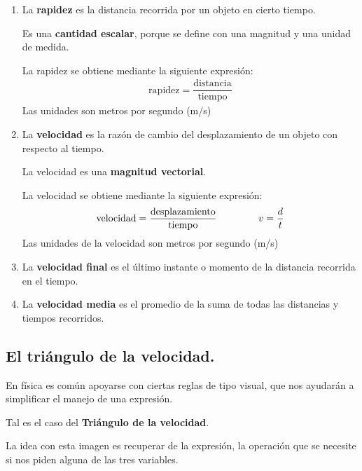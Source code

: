 \documentclass[14pt]{extarticle}
\newcommand{\textocolor}[2]{\textbf{\textcolor{#1}{#2}}}
\begin{document}
\begin{enumerate}
\item La \textocolor{auburn}{rapidez} es la distancia recorrida por un objeto en cierto tiempo.

Es una \textocolor{awesome}{cantidad escalar}, porque se define con una magnitud y una unidad de medida.

La rapidez se obtiene mediante la siguiente expresión:
\begin{align*}
\text{rapidez} = \dfrac{\text{distancia}}{\text{tiempo}}
\end{align*}
Las unidades son metros por segundo (\unit[per-mode=symbol]{\meter\per\second})

\item La \textocolor{carmine}{velocidad} es la razón de cambio del desplazamiento de un objeto con respecto al tiempo.

La velocidad es una \textocolor{byzantine}{magnitud vectorial}.

La velocidad se obtiene mediante la siguiente expresión:
\begin{eqnarray*}
\begin{aligned}
\text{velocidad} = \dfrac{\text{desplazamiento}}{\text{tiempo}}  \hspace*{1.5cm} v = \dfrac{d}{t}
\end{aligned}
\end{eqnarray*}
Las unidades de la velocidad son metros por segundo (\unit[per-mode=symbol]{\meter\per\second})
\item La \textocolor{coolblack}{velocidad final} es el último instante o momento de la distancia recorrida en el tiempo.
\item La \textocolor{cornellred}{velocidad media} es el promedio de la suma de todas las distancias y tiempos recorridos.
\end{enumerate}

\subsection{El triángulo de la velocidad.}

En física es común apoyarse con ciertas reglas de tipo visual, que nos ayudarán a simplificar el manejo de una expresión.

Tal es el caso del \textbf{Triángulo de la velocidad}.

\begin{figure}[H]
\centering
{}
\end{figure}
La idea con esta imagen es recuperar de la expresión, la operación que se necesite si nos piden alguna de las tres variables.
\end{document}
